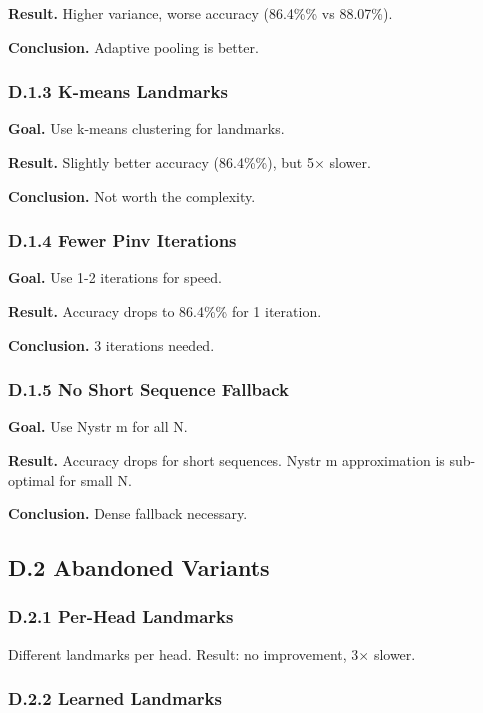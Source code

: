 \textbf{Result.} Higher variance, worse accuracy (86.4\%\% vs 88.07\%).

\textbf{Conclusion.} Adaptive pooling is better.

\subsubsection{D.1.3 K-means Landmarks}

\textbf{Goal.} Use k-means clustering for landmarks.

\textbf{Result.} Slightly better accuracy (86.4\%\%), but 5$\times$ slower.

\textbf{Conclusion.} Not worth the complexity.

\subsubsection{D.1.4 Fewer Pinv Iterations}

\textbf{Goal.} Use 1-2 iterations for speed.

\textbf{Result.} Accuracy drops to 86.4\%\% for 1 iteration.

\textbf{Conclusion.} 3 iterations needed.

\subsubsection{D.1.5 No Short Sequence Fallback}

\textbf{Goal.} Use Nystr m for all N.

\textbf{Result.} Accuracy drops for short sequences. Nystr m approximation is 
sub-optimal for small N.

\textbf{Conclusion.} Dense fallback necessary.

\subsection{D.2 Abandoned Variants}

\subsubsection{D.2.1 Per-Head Landmarks}

Different landmarks per head. Result: no improvement, 3$\times$ slower.

\subsubsection{D.2.2 Learned Landmarks}

